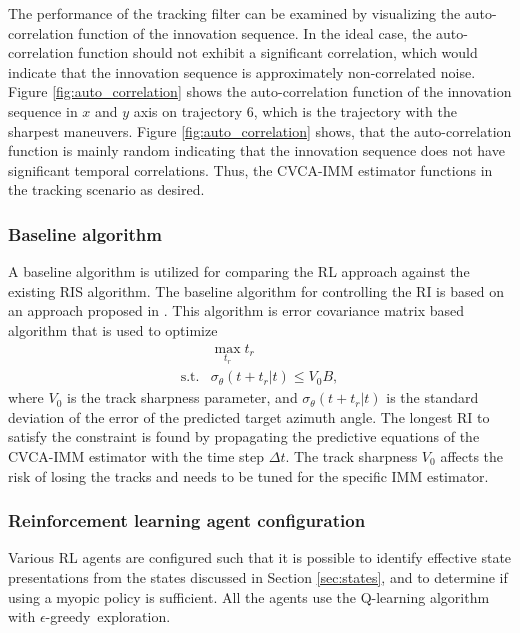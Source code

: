 \documentclass[english, 12pt, a4paper, elec, utf8, a-1b, online]{aaltothesis}
\newcommand{\egreedy}{$\epsilon$-greedy~}
\newcommand{\dt}{\Delta t}
\newcommand{\ri}{t_r}
\begin{document}
The performance of the tracking filter can be examined by visualizing the auto-correlation function of the innovation sequence.
In the ideal case, the auto-correlation function should not exhibit a significant correlation, which would indicate that the innovation sequence is approximately non-correlated noise.
Figure \ref{fig:auto_correlation} shows the auto-correlation function of the innovation sequence in $x$ and $y$ axis on trajectory 6, which is the trajectory with the sharpest maneuvers.
Figure \ref{fig:auto_correlation} shows, that the auto-correlation function is mainly random indicating that the innovation sequence does not have significant temporal correlations.
Thus, the CVCA-IMM estimator functions in the tracking scenario as desired.



\subsubsection{Baseline algorithm} \label{sec:baseline_algorithm}

A baseline algorithm is utilized for comparing the RL approach against the existing RIS algorithm.
The baseline algorithm for controlling the RI is based on an approach proposed in \cite{Daeipour1994}.
This algorithm is error covariance matrix based algorithm that is used to optimize
\begin{equation}\label{eq:baseline_ineq}
    \begin{array}{ll}
         & \max_{t_r} t_r \\
        \text{s.t.} & \sigma_\theta(t+\ri|t) \leq V_0 B, 
    \end{array}
\end{equation}
where $V_0$ is the track sharpness parameter, and $\sigma_\theta(t+\ri|t)$ is the standard deviation of the error of the predicted target azimuth angle.
The longest RI to satisfy the constraint is found by propagating the predictive equations of the CVCA-IMM estimator with the time step $\dt$.
The track sharpness $V_0$ affects the risk of losing the tracks and needs to be tuned for the specific IMM estimator.

\subsubsection{Reinforcement learning agent configuration}\label{sec:RL_config}

Various RL agents are configured such that it is possible to identify effective state presentations from the states discussed in Section \ref{sec:states}, and to determine if using a myopic policy is sufficient.
All the agents use the Q-learning algorithm with \egreedy exploration.
\end{document}
